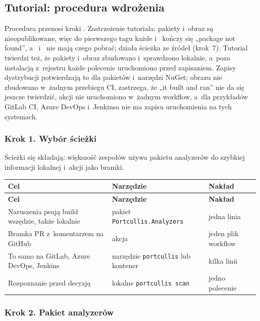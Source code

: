 \subsection{Tutorial: procedura wdrożenia}\label{sec:portcullis-tutorial}

Procedura przenosi kroki . Zastrzeżenie tutoriala: pakiety
i~obraz są nieopublikowane, więc do pierwszego tagu  każde
 i~ kończy się „package not
found”, a~ i~ nie mają czego pobrać; działa
ścieżka ze źródeł (krok~7). Tutorial twierdzi też, że pakiety i~obraz zbudowano
i~sprawdzono lokalnie, a~poza instalacją z~rejestru każde polecenie uruchomiono przed
zapisaniem. Zapisy dystrybucji potwierdzają to dla pakietów i~narzędzi NuGet; obrazu nie
zbudowano w~żadnym przebiegu CI,  zastrzega, że „it built and ran”
nie da się jeszcze twierdzić, akcji nie uruchomiono w~żadnym workflow, a~dla przykładów
GitLab CI, Azure DevOps i~Jenkinsa nie ma zapisu uruchomienia na tych systemach.

\subsubsection{Krok 1. Wybór ścieżki}

Ścieżki się składają: większość zespołów używa pakietu
analyzerów do szybkiej informacji lokalnej i~akcji jako bramki.

\begin{xltabular}{\linewidth}{@{}>{\raggedright\arraybackslash}X >{\raggedright\arraybackslash}p{5.2cm} l@{}}
\toprule
\textbf{Cel} & \textbf{Narzędzie} & \textbf{Nakład} \\
\midrule
\endfirsthead
\toprule
\textbf{Cel} & \textbf{Narzędzie} & \textbf{Nakład} \\
\midrule
\endhead
Naruszenia psują build wszędzie, także lokalnie & pakiet \texttt{Portcullis.Analyzers} & jedna linia \\
Bramka PR z~komentarzem na GitHub & akcja & jeden plik workflow \\
To samo na GitLab, Azure DevOps, Jenkins & narzędzie \texttt{portcullis} lub kontener & kilka linii \\
Rozpoznanie przed decyzją & lokalne \texttt{portcullis scan} & jedno polecenie \\
\bottomrule
\end{xltabular}

\subsubsection{Krok 2. Pakiet analyzerów}

